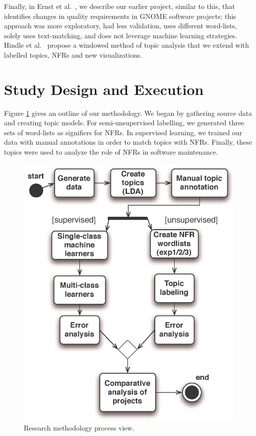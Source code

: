 \documentclass[smallextended]{svjour3}       %
\begin{document}
Finally, in Ernst et al.~\cite{ernst10refsq}, we describe our earlier
project, similar to this, that identifies changes in quality requirements
in GNOME software projects; this approach was more exploratory, had
less validation, uses different word-lists, solely uses text-matching,
and does not leverage machine learning strategies. 
Hindle et al.~\cite{Hindle09ICSM} propose a windowed method of topic
analysis that we extend with labelled
topics, NFRs and new visualizations.




\section{Study Design and Execution}
Figure \ref{fig:process} gives an outline of our methodology.
We began by gathering source data and creating topic models. For semi-unsupervised labelling, we generated three sets of word-lists as signifiers for NFRs.
In supervised learning, we trained our data with manual annotations in order to match topics with NFRs. Finally, these topics were used to analyze the role of NFRs in software maintenance.

\begin{figure}
  \centering
 \includegraphics[width=.45\textwidth]{figures/process-model}
 \caption{Research methodology process view.}
  \label{fig:process}
\end{figure}
\end{document}
